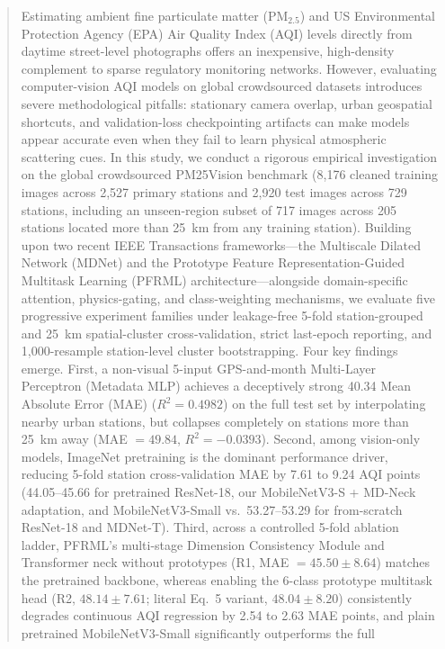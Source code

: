 \documentclass[conference]{IEEEtran}
\newcommand{\pmtwofive}{PM$_{2.5}$}
\begin{document}
\begin{abstract}
  Estimating ambient fine particulate matter (\pmtwofive) and US Environmental
  Protection Agency (EPA) Air Quality Index (AQI) levels directly from daytime
  street-level photographs offers an inexpensive, high-density complement to
  sparse regulatory monitoring networks. However, evaluating computer-vision AQI
  models on global crowdsourced datasets introduces severe methodological
  pitfalls: stationary camera overlap, urban geospatial shortcuts, and
  validation-loss checkpointing artifacts can make models appear accurate even
  when they fail to learn physical atmospheric scattering cues. In this study,
  we conduct a rigorous empirical investigation on the global crowdsourced
  PM25Vision benchmark (8,176 cleaned training images across 2,527 primary
  stations and 2,920 test images across 729 stations, including an unseen-region
  subset of 717 images across 205 stations located more than 25~km from any
  training station). Building upon two recent IEEE Transactions frameworks---the
  Multiscale Dilated Network (MDNet) and the Prototype Feature
  Representation-Guided Multitask Learning (PFRML) architecture---alongside
  domain-specific attention, physics-gating, and class-weighting mechanisms, we
  evaluate five progressive experiment families under leakage-free 5-fold
  station-grouped and 25~km spatial-cluster cross-validation, strict last-epoch
  reporting, and 1,000-resample station-level cluster bootstrapping. Four key
  findings emerge. First, a non-visual 5-input GPS-and-month Multi-Layer
  Perceptron (Metadata MLP) achieves a deceptively strong 40.34 Mean Absolute
  Error (MAE) ($R^2 = 0.4982$) on the full test set by interpolating nearby
  urban stations, but collapses completely on stations more than 25~km away (MAE
  $= 49.84$, $R^2 = -0.0393$). Second, among vision-only models, ImageNet
  pretraining is the dominant performance driver, reducing 5-fold station
  cross-validation MAE by 7.61 to 9.24 AQI points (44.05--45.66 for pretrained
  ResNet-18, our MobileNetV3-S + MD-Neck adaptation, and MobileNetV3-Small
  vs.\ 53.27--53.29 for from-scratch ResNet-18 and MDNet-T). Third, across a
  controlled 5-fold ablation ladder, PFRML's multi-stage Dimension Consistency
  Module and Transformer neck without prototypes (R1, MAE $= 45.50 \pm 8.64$)
  matches the pretrained backbone, whereas enabling the 6-class prototype
  multitask head (R2, $48.14 \pm 7.61$; literal Eq.~5 variant, $48.04 \pm 8.20$)
  consistently degrades continuous AQI regression by 2.54 to 2.63 MAE points,
  and plain pretrained MobileNetV3-Small significantly outperforms the full

\end{abstract}
\end{document}
